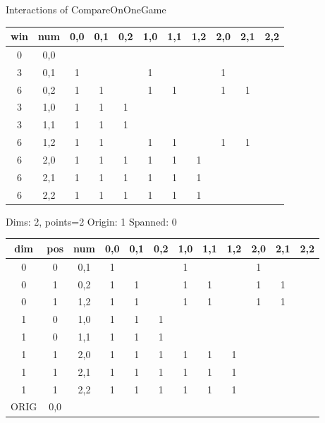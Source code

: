 Interactions of CompareOnOneGame
\begin{tabular}{ccccccccccc}
\hline
  win  &  num  &  0,0  &  0,1  &  0,2  &  1,0  &  1,1  &  1,2  &  2,0  &  2,1  &  2,2  \\
\hline
   0   &  0,0  &       &       &       &       &       &       &       &       &       \\
   3   &  0,1  &   1   &       &       &   1   &       &       &   1   &       &       \\
   6   &  0,2  &   1   &   1   &       &   1   &   1   &       &   1   &   1   &       \\
   3   &  1,0  &   1   &   1   &   1   &       &       &       &       &       &       \\
   3   &  1,1  &   1   &   1   &   1   &       &       &       &       &       &       \\
   6   &  1,2  &   1   &   1   &       &   1   &   1   &       &   1   &   1   &       \\
   6   &  2,0  &   1   &   1   &   1   &   1   &   1   &   1   &       &       &       \\
   6   &  2,1  &   1   &   1   &   1   &   1   &   1   &   1   &       &       &       \\
   6   &  2,2  &   1   &   1   &   1   &   1   &   1   &   1   &       &       &       \\
\hline
\end{tabular}


Dims: 2, points=2 Origin: 1 Spanned: 0
\begin{tabular}{cccccccccccc}
\hline
  dim  &  pos  &  num  &  0,0  &  0,1  &  0,2  &  1,0  &  1,1  &  1,2  &  2,0  &  2,1  &  2,2  \\
\hline
   0   &   0   &  0,1  &   1   &       &       &   1   &       &       &   1   &       &       \\
   0   &   1   &  0,2  &   1   &   1   &       &   1   &   1   &       &   1   &   1   &       \\
   0   &   1   &  1,2  &   1   &   1   &       &   1   &   1   &       &   1   &   1   &       \\
   1   &   0   &  1,0  &   1   &   1   &   1   &       &       &       &       &       &       \\
   1   &   0   &  1,1  &   1   &   1   &   1   &       &       &       &       &       &       \\
   1   &   1   &  2,0  &   1   &   1   &   1   &   1   &   1   &   1   &       &       &       \\
   1   &   1   &  2,1  &   1   &   1   &   1   &   1   &   1   &   1   &       &       &       \\
   1   &   1   &  2,2  &   1   &   1   &   1   &   1   &   1   &   1   &       &       &       \\
 ORIG  &  0,0  &       &       &       &       &       &       &       &       &       &       \\
 \hline
\end{tabular}
